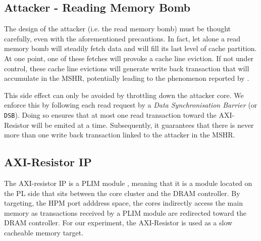     \subsection{Attacker - Reading Memory Bomb}
        \label{subsec:attacker_reading_memory_bomb}
        The design of the attacker (i.e. the read memory bomb) must be thought carefully, even with the aforementioned precautions. In fact, let alone a read memory bomb will steadily fetch data and will fill its last level of cache partition. At one point, one of these fetches will provoke a cache line eviction. If not under control, these cache line evictions will generate write back transaction that will accumulate in the MSHR, potentially leading to the phenomenon reported by \cite{Heechul_DDOS_attacks_on_shared_cache}.



        This side effect can only be avoided by throttling down the attacker core. We enforce this by following each read request by a \emph{Data Synchronisation Barrier} (or \texttt{DSB}). Doing so ensures that at most one read transaction toward the AXI-Resistor will be emited at a time. Subsequently, it guarantees that there is never more than one write back transaction linked to the attacker in the MSHR.

    \subsection{AXI-Resistor IP}
        \label{subsec:axi-resistor}

        The AXI-resistor IP is a PLIM module \cite{PLIM20}, meaning that it is a module located on the PL side that sits between the core cluster and the DRAM controller. By targeting, the HPM port adddress space, the cores indirectly access the main memory as transactions received by a PLIM module are redirected toward the DRAM controller.  For our experiment, the AXI-Resistor is used as a slow cacheable memory target.

